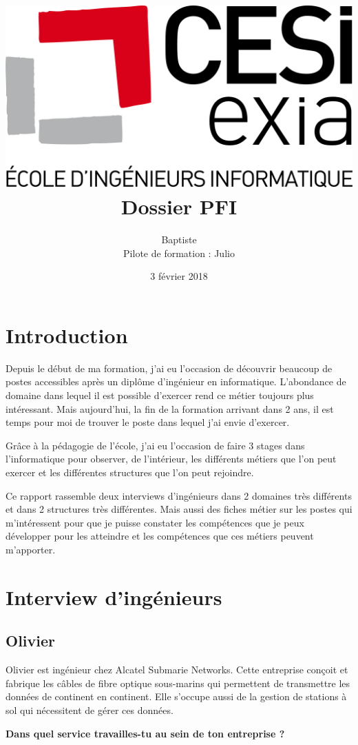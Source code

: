 \documentclass{article}
\title{\includegraphics[scale=0.1]{exia.png}\vspace{2cm}\\Dossier PFI}
\date{3 février 2018}
\author{Baptiste \bsc{Saclier}\\Pilote de formation : Julio \bsc{Santilario}}
\newcommand{\question}[1]{\medskip\noindent\textbf{#1}\medskip}
\begin{document}
    \maketitle

    \clearpage

    \tableofcontents

    \section{Introduction}

    Depuis le début de ma formation, j'ai eu l'occasion de découvrir beaucoup de postes accessibles après un diplôme d'ingénieur en informatique.
    L'abondance de domaine dans lequel il est possible d'exercer rend ce métier toujours plus intéressant.
    Mais aujourd'hui, la fin de la formation arrivant dans 2 ans, il est temps pour moi de trouver le poste dans lequel j'ai envie d'exercer.

    Grâce à la pédagogie de l'école, j'ai eu l'occasion de faire 3 stages dans l'informatique pour observer, de l'intérieur, les différents métiers que l'on peut exercer et les différentes structures que l'on peut rejoindre.

    Ce rapport rassemble deux interviews d'ingénieurs dans 2 domaines très différents et dans 2 structures très différentes.
    Mais aussi des fiches métier sur les postes qui m'intéressent pour que je puisse constater les compétences que je peux développer pour les atteindre et les compétences que ces métiers peuvent m'apporter.

    \clearpage

    \section{Interview d'ingénieurs}


    \subsection{Olivier }

    Olivier est ingénieur chez Alcatel Submarie Networks.
    Cette entreprise conçoit et fabrique les câbles de fibre optique sous-marins qui permettent de transmettre les données de continent en continent.
    Elle s'occupe aussi de la gestion de stations à sol qui nécessitent de gérer ces données.

    \question{Dans quel service travailles-tu au sein de ton entreprise ?}
\end{document}

